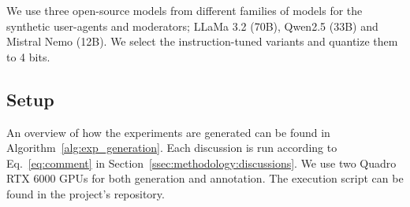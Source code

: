 We use three open-source models from different families of models for the synthetic user-agents and moderators; LLaMa 3.2 (70B), Qwen2.5 (33B) and Mistral Nemo (12B). We select the instruction-tuned variants and quantize them to 4 bits.


\subsection{Setup}

An overview of how the experiments are generated can be found in Algorithm~\ref{alg:exp_generation}. Each discussion is run according to Eq.~\ref{eq:comment} in Section~\ref{ssec:methodology:discussions}. We use two Quadro RTX 6000 GPUs for both generation and annotation. The execution script can be found in the project's repository\analysislink.

